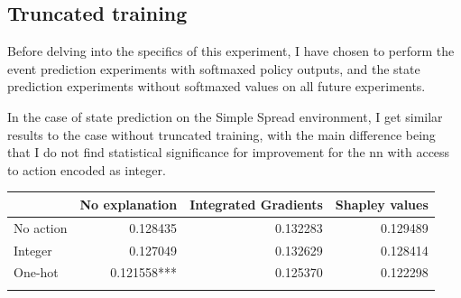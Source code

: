 \documentclass[UKenglish]{uiomasterthesis}
\begin{document}
\subsection{Truncated training}
Before delving into the specifics of this experiment, I have chosen to perform the event prediction experiments with softmaxed policy outputs, and the state prediction experiments without softmaxed values on all future experiments.

In the case of state prediction on the Simple Spread environment, I get similar results to the case without truncated training, with the main difference being that I do not find statistical significance for improvement for the \ac{nn} with access to action encoded as integer.

\begin{center}
\label{tab:state_simpl_trunc}
\begin{tabular}{lrrr}
\toprule
& No explanation & Integrated Gradients & Shapley values \\
\midrule
No action & 0.128435 & 0.132283 & 0.129489 \\
Integer & 0.127049 & 0.132629 & 0.128414 \\
One-hot & 0.121558*** & 0.125370 & 0.122298 \\
\bottomrule
\addlinespace[2pt]
\multicolumn{3}{l}{\textsuperscript{***}$p<0.001$, 
  \textsuperscript{**}$p<0.01$, 
  \textsuperscript{*}$p<0.05$}
\end{tabular}
\end{center}
\end{document}
